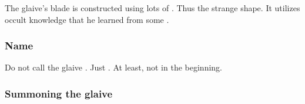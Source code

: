 The glaive's blade is constructed using lots of . 
Thus the strange shape. 
It utilizes occult knowledge that he learned from some . 





\subsubsection{Name}
Do not call the glaive \quo{\Rystessakhin}. 
Just .
At least, not in the beginning. 





\subsubsection{Summoning the glaive}
